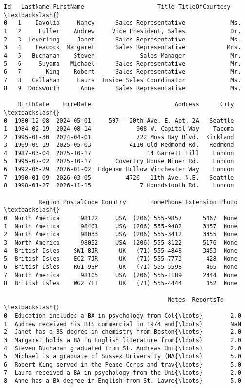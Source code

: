 \documentclass[11pt]{article}
\begin{document}
    \begin{Verbatim}[commandchars=\\\{\}]
   Id   LastName FirstName                     Title TitleOfCourtesy  \textbackslash{}
0   1    Davolio     Nancy      Sales Representative             Ms.
1   2     Fuller    Andrew     Vice President, Sales             Dr.
2   3  Leverling     Janet      Sales Representative             Ms.
3   4    Peacock  Margaret      Sales Representative            Mrs.
4   5   Buchanan    Steven             Sales Manager             Mr.
5   6     Suyama   Michael      Sales Representative             Mr.
6   7       King    Robert      Sales Representative             Mr.
7   8   Callahan     Laura  Inside Sales Coordinator             Ms.
8   9  Dodsworth      Anne      Sales Representative             Ms.

    BirthDate    HireDate                        Address      City  \textbackslash{}
0  1980-12-08  2024-05-01     507 - 20th Ave. E. Apt. 2A   Seattle
1  1984-02-19  2024-08-14             908 W. Capital Way    Tacoma
2  1995-08-30  2024-04-01             722 Moss Bay Blvd.  Kirkland
3  1969-09-19  2025-05-03           4110 Old Redmond Rd.   Redmond
4  1987-03-04  2025-10-17                14 Garrett Hill    London
5  1995-07-02  2025-10-17       Coventry House Miner Rd.    London
6  1992-05-29  2026-01-02  Edgeham Hollow Winchester Way    London
7  1990-01-09  2026-03-05          4726 - 11th Ave. N.E.   Seattle
8  1998-01-27  2026-11-15              7 Houndstooth Rd.    London

          Region PostalCode Country       HomePhone Extension Photo  \textbackslash{}
0  North America      98122     USA  (206) 555-9857      5467  None
1  North America      98401     USA  (206) 555-9482      3457  None
2  North America      98033     USA  (206) 555-3412      3355  None
3  North America      98052     USA  (206) 555-8122      5176  None
4  British Isles    SW1 8JR      UK   (71) 555-4848      3453  None
5  British Isles    EC2 7JR      UK   (71) 555-7773       428  None
6  British Isles    RG1 9SP      UK   (71) 555-5598       465  None
7  North America      98105     USA  (206) 555-1189      2344  None
8  British Isles    WG2 7LT      UK   (71) 555-4444       452  None

                                               Notes  ReportsTo  \textbackslash{}
0  Education includes a BA in psychology from Col{\ldots}        2.0
1  Andrew received his BTS commercial in 1974 and{\ldots}        NaN
2  Janet has a BS degree in chemistry from Boston{\ldots}        2.0
3  Margaret holds a BA in English literature from{\ldots}        2.0
4  Steven Buchanan graduated from St. Andrews Uni{\ldots}        2.0
5  Michael is a graduate of Sussex University (MA{\ldots}        5.0
6  Robert King served in the Peace Corps and trav{\ldots}        5.0
7  Laura received a BA in psychology from the Uni{\ldots}        2.0
8  Anne has a BA degree in English from St. Lawre{\ldots}        5.0


\end{Verbatim}
\end{document}
